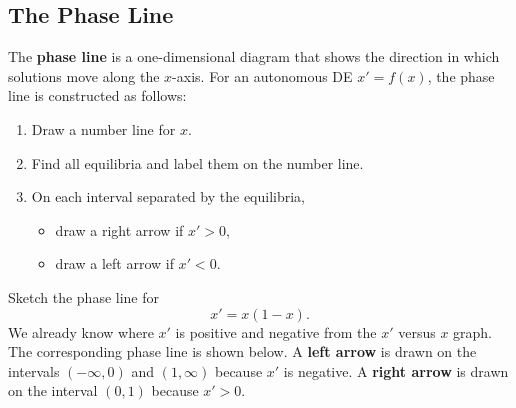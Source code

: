 \documentclass[09pt,letterpaper]{article}
\begin{document}
\subsection{The Phase Line}

The \textbf{phase line} is a one-dimensional diagram that shows the
direction in which solutions move along the $x$-axis. For an autonomous DE $x'=f(x)$, the phase line is constructed as follows:
\begin{enumerate}
    \item Draw a number line for $x$.
    \item Find all equilibria and label them on the number line.
    \item On each interval separated by the equilibria,
    \begin{itemize}
        \item draw a right arrow if $x'>0$,
        \item draw a left arrow if $x'<0$.
    \end{itemize}
\end{enumerate}

\begin{example}[4]{
Sketch the phase line for
\[
    x'=x(1-x).
\]
}
We already know where $x'$ is positive and negative from the $x'$ versus
$x$ graph. The corresponding phase line is shown below. A \textbf{left arrow} is drawn on the intervals $(-\infty,0)$ and $(1,\infty)$ because $x'$ is negative. A \textbf{right arrow} is drawn on the interval $(0,1)$ because $x'>0$. 
\begin{figure}[H]
    \centering
{}
\end{figure}

\end{example}
\end{document}
